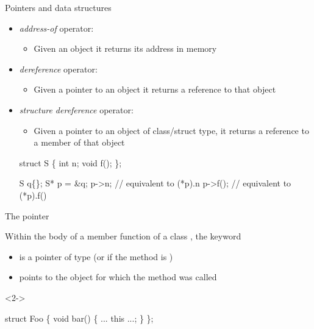 \begin{frame}[fragile]{Pointers and data structures}

  \begin{itemize}
  \item<1-> \textit{address-of} operator: \alert{\code{\&}}
    \begin{itemize}
    \item Given an object it returns its address in memory
    \end{itemize}
  \item<2-> \textit{dereference} operator: \alert{\code{*}}
    \begin{itemize}
    \item Given a pointer to an object it returns a reference to that object
    \end{itemize}
  \item<3-> \textit{structure dereference} operator: \alert{\code{->}}
    \begin{itemize}
    \item Given a pointer to an object of class/struct type, it returns a
      reference to a member of that object
    \end{itemize}
    \begin{codeblock}
struct S \{
  int n;
  void f();
\};

S q\{\ddd\};
S* p = &q;
p->n;        // equivalent to (*p).n
p->f();      // equivalent to (*p).f()\end{codeblock}

  \end{itemize}
\end{frame}

\begin{frame}[fragile]{The  pointer}

  Within the body of a member function of a class , the keyword
  \textbf{}
  \begin{itemize}
  \item is a pointer of type  (or  if the method is
    )
  \item points to the object for which the method was called
  \end{itemize}

\begin{codeblock}<2->{
struct Foo \{
  void bar() \{
    ... \alert{this} ...;
  \}
\};

}\end{codeblock}

\end{frame}

